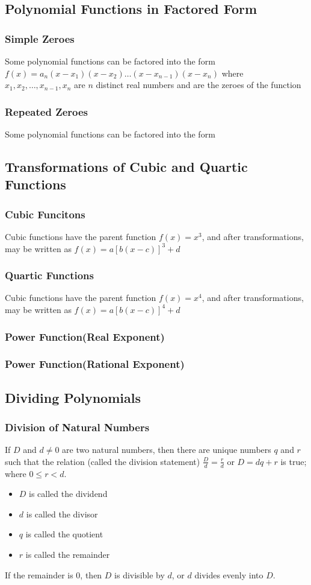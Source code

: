 \documentclass{article}
\begin{document}
	\subsection{Polynomial Functions in Factored Form}
	\subsubsection{Simple Zeroes}
	Some polynomial functions can be factored into the form $f(x)=a_n(x-x_1)(x-x_2)\dots(x-x_{n-1})(x-x_n)$ where $x_1, x_2, \dots, x_{n-1}, x_n$ are $n$ distinct real numbers and are the zeroes of the function
	\subsubsection{Repeated Zeroes}
	Some polynomial functions can be factored into the form 
	\subsection{Transformations of Cubic and Quartic Functions}
	\subsubsection{Cubic Funcitons}
	Cubic functions have the parent function $f(x)=x^3$, and after transformations, may be written as $f(x)=a[b(x-c)]^3+d$
	\subsubsection{Quartic Functions}
	Cubic functions have the parent function $f(x)=x^4$, and after transformations, may be written as $f(x)=a[b(x-c)]^4+d$
	\subsubsection{Power Function(Real Exponent)}
	\subsubsection{Power Function(Rational Exponent)}
	\subsection{Dividing Polynomials}
	\subsubsection{Division of Natural Numbers}
	If $D$ and $d\neq0$ are two natural numbers, then there are unique numbers $q$ and $r$ such that the relation (called the division statement) $\frac{D}{d}=\frac{r}{d}$ or $D=dq+r$ is true; where $0\leq r<d$.
	\begin{itemize}
		\item $D$ is called the dividend
		\item $d$ is called the divisor
		\item $q$ is called the quotient
		\item $r$ is called the remainder
	\end{itemize}
	If the remainder is 0, then $D$ is divisible by $d$, or $d$ divides evenly into $D$.
\end{document}
